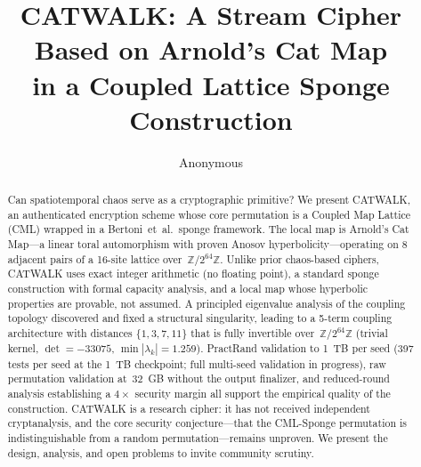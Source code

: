 \documentclass[runningheads]{llncs}
\newcommand{\Ztwo}{\mathbb{Z}/2^{64}\mathbb{Z}}
\begin{document}
\title{CATWALK: A Stream Cipher Based on Arnold's Cat Map\\in a Coupled Lattice Sponge Construction}

\author{Anonymous}

\maketitle

\begin{abstract}
Can spatiotemporal chaos serve as a cryptographic primitive?
We present CATWALK, an authenticated encryption scheme whose core permutation
is a Coupled Map Lattice (CML) wrapped in a Bertoni~et~al.\ sponge framework.
The local map is Arnold's Cat Map---a linear toral automorphism with proven
Anosov hyperbolicity---operating on 8 adjacent pairs of a 16-site lattice
over~$\Ztwo$.  Unlike prior chaos-based ciphers, CATWALK uses
exact integer arithmetic (no floating point), a standard sponge construction
with formal capacity analysis, and a local map whose hyperbolic properties are
provable, not assumed.  A principled eigenvalue analysis of the coupling
topology discovered and fixed a structural singularity, leading to a 5-term
coupling architecture with distances $\{1,3,7,11\}$ that is fully invertible
over~$\Ztwo$ (trivial kernel, $\det = -33075$, $\min|\lambda_k| = 1.259$).
PractRand validation to 1~TB per seed (397 tests per seed at the 1~TB checkpoint;
full multi-seed validation in progress), raw
permutation validation at~32~GB without the output finalizer, and
reduced-round analysis establishing a $4\times$ security margin all support
the empirical quality of the construction.  CATWALK is a research cipher: it
has not received independent cryptanalysis, and the core security conjecture---that the CML-Sponge permutation is indistinguishable from a random
permutation---remains unproven.  We present the design, analysis, and open
problems to invite community scrutiny.
\end{abstract}


\end{document}
